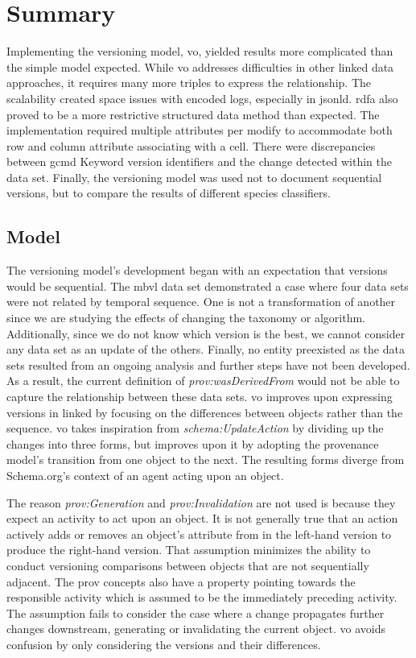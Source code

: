 \section{Summary}

Implementing the versioning model, \gls{vo}, yielded results more complicated than the simple model expected.
While \gls{vo} addresses difficulties in other linked data approaches, it requires many more triples to express the relationship.
The scalability created space issues with encoded \glspl{log}, especially in \gls{jsonld}.
\gls{rdfa} also proved to be a more restrictive structured data method than expected.
The implementation required multiple attributes per \gls{modify} to accommodate both row and column \gls{attribute} associating with a cell.
There were discrepancies between \gls{gcmd} Keyword version identifiers and the change detected within the data set.
Finally, the versioning model was used not to document sequential \glspl{version}, but to compare the results of different species classifiers.

\subsection{Model}

The versioning model's development began with an expectation that versions would be sequential.
The \gls{mbvl} data set demonstrated a case where four data sets were not related by temporal sequence.
One is not a transformation of another since we are studying the effects of changing the taxonomy or algorithm.
Additionally, since we do not know which \gls{version} is the best, we cannot consider any data set as an update of the others.
Finally, no entity preexisted as the data sets resulted from an ongoing analysis and further steps have not been developed.
As a result, the current definition of \textit{prov:wasDerivedFrom} would not be able to capture the relationship between these data sets.
\gls{vo} improves upon expressing \glspl{version} in \gls{linked} by focusing on the differences between objects rather than the sequence.
\gls{vo} takes inspiration from \textit{schema:UpdateAction} by dividing up the \glspl{change} into three forms, but improves upon it by adopting the provenance model's transition from one object to the next.
The resulting forms diverge from Schema.org's context of an agent acting upon an object.

The reason \textit{prov:Generation} and \textit{prov:Invalidation} are not used is because they expect an activity to act upon an object.
It is not generally true that an action actively adds or removes an object's \gls{attribute} from in the left-hand \gls{version} to produce the right-hand \gls{version}.
That assumption minimizes the ability to conduct versioning comparisons between objects that are not sequentially adjacent.
The \gls{prov} concepts also have a property pointing towards the responsible activity which is assumed to be the immediately preceding activity.
The assumption fails to consider the case where a \gls{change} propagates further \glspl{change} downstream, generating or invalidating the current object.
\gls{vo} avoids confusion by only considering the \glspl{version} and their differences.

